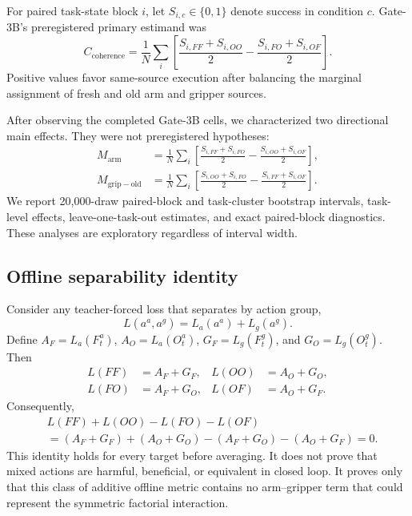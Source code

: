 For paired task-state block $i$, let $S_{i,c}\in\{0,1\}$ denote success in
condition $c$. Gate-3B's preregistered primary estimand was
\begin{equation}
C_{\mathrm{coherence}}=\frac{1}{N}\sum_i
\left[\frac{S_{i,FF}+S_{i,OO}}{2}
-\frac{S_{i,FO}+S_{i,OF}}{2}\right].
\end{equation}
Positive values favor same-source execution after balancing the marginal
assignment of fresh and old arm and gripper sources.

After observing the completed Gate-3B cells, we characterized two directional
main effects. They were not preregistered hypotheses:
\begin{align}
M_{\mathrm{arm}}&=\frac{1}{N}\sum_i
\left[\frac{S_{i,FF}+S_{i,FO}}{2}
-\frac{S_{i,OO}+S_{i,OF}}{2}\right],\\
M_{\mathrm{grip-old}}&=\frac{1}{N}\sum_i
\left[\frac{S_{i,OO}+S_{i,FO}}{2}
-\frac{S_{i,FF}+S_{i,OF}}{2}\right].
\end{align}
We report 20,000-draw paired-block and task-cluster bootstrap intervals,
task-level effects, leave-one-task-out estimates, and exact paired-block
diagnostics. These analyses are exploratory regardless of interval width.

\subsection{Offline separability identity}

Consider any teacher-forced loss that separates by action group,
\begin{equation}
L(a^a,a^g)=L_a(a^a)+L_g(a^g).
\end{equation}
Define $A_F=L_a(F_t^a)$, $A_O=L_a(O_t^a)$,
$G_F=L_g(F_t^g)$, and $G_O=L_g(O_t^g)$. Then
\begin{align}
L(FF)&=A_F+G_F, & L(OO)&=A_O+G_O,\\
L(FO)&=A_F+G_O, & L(OF)&=A_O+G_F.
\end{align}
Consequently,
\begin{align}
&L(FF)+L(OO)-L(FO)-L(OF)\\
&=(A_F+G_F)+(A_O+G_O)-(A_F+G_O)-(A_O+G_F)=0.
\end{align}
This identity holds for every target before averaging. It does not prove that
mixed actions are harmful, beneficial, or equivalent in closed loop. It proves
only that this class of additive offline metric contains no arm--gripper term
that could represent the symmetric factorial interaction.

